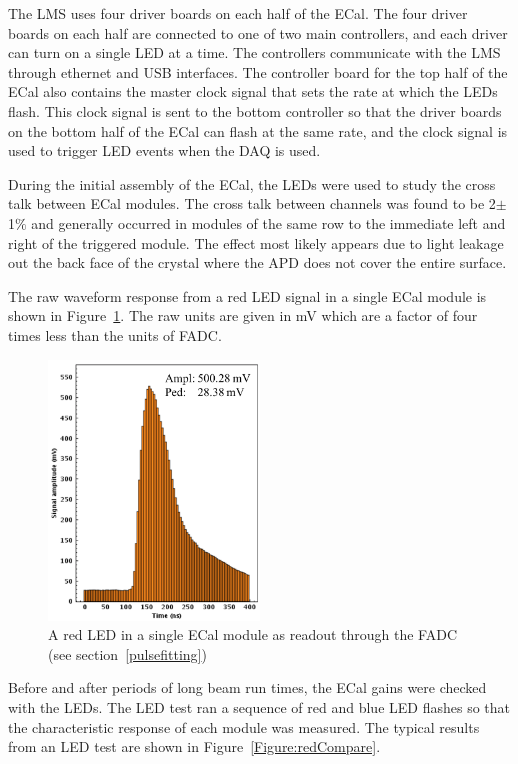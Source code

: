 The LMS uses four driver boards on each half of the ECal. The four driver boards on each half are connected to one of two main controllers, and each driver can turn on a single LED at a time. The controllers communicate with the LMS through ethernet and USB interfaces. The controller board for the top half of the ECal also contains the master clock signal that sets the rate at which the LEDs flash. This clock signal is sent to the bottom controller so that the driver boards on the bottom half of the ECal can flash at the same rate, and the clock signal is used to trigger LED events when the DAQ is used. 


During the initial assembly of the ECal, the LEDs were used to study the cross talk between ECal modules. The cross talk between channels was found to be 2$\pm$1$\%$ and generally occurred in modules of the same row to the immediate left and right of the triggered module. The effect most likely appears due to light leakage out the back face of the crystal where the APD does not cover the entire surface.

The raw waveform response from a red LED signal in a single ECal module is shown in Figure~\ref{Figure:redSignal}. The raw units are given in mV which are a factor of four times less than the units of FADC.

\begin{figure}[htb]
  \centering
      \includegraphics[width=0.5\textwidth]{pics/experiment/ledSignal.png}
  \caption[LED signal in ECal FADC]{A red LED in a single ECal module as readout through the FADC (see section~\ref{pulsefitting})}
  \label{Figure:redSignal}
\end{figure}

Before and after periods of long beam run times, the ECal gains were checked with the LEDs. The LED test ran a sequence of red and blue LED flashes so that the characteristic response of each module was measured. The typical results from an LED test are shown in Figure~\ref{Figure:redCompare}.

